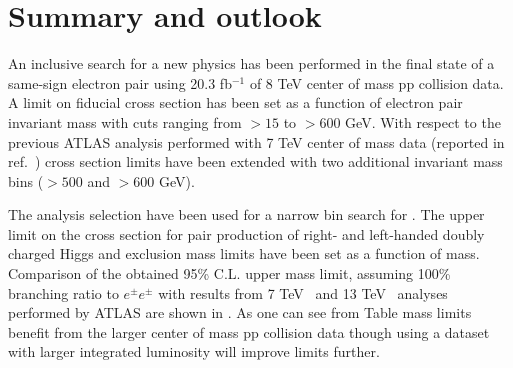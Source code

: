 \section{Summary and outlook}
\label{sec:ssOutlook}

An inclusive search for a new physics has been performed in the final state of a same-sign electron pair using 20.3 fb$^{-1}$ of 8 TeV center of mass pp collision data. A limit on fiducial cross section has been set as a function of electron pair invariant mass with cuts ranging from $>15$ to $>600$ GeV. 
With respect to the previous ATLAS analysis performed with 7 TeV center of mass data (reported in ref.~\cite{ss_7TeV}) cross section limits have been 
extended with two additional invariant mass bins ($>500$ and $>600$ GeV).

The analysis selection have been used for a narrow bin search for \dch.
The upper limit on the cross section for pair production of right- and left-handed doubly charged Higgs and exclusion mass limits have been set as a function of \dch mass.
Comparison of the obtained 95\% C.L. upper \dch mass limit, assuming 100\% branching ratio to $e^{\pm}e^{\pm}$ with results from 7 TeV~\cite{dch_7TeV_paper} and 13 TeV~\cite{dch_13TeV_conf} analyses performed by ATLAS are shown in .
As one can see from Table mass limits benefit from the larger center of mass pp collision data though using a dataset with larger integrated luminosity will improve limits further.

